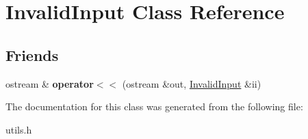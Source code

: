 \hypertarget{class_invalid_input}{}\section{Invalid\+Input Class Reference}
\label{class_invalid_input}
\subsection*{Friends}
\begin{DoxyCompactItemize}
\item 
\hypertarget{class_invalid_input_a6ecc3c0d128c8411aa7a7d336191c9e3}{}\label{class_invalid_input_a6ecc3c0d128c8411aa7a7d336191c9e3} 
ostream \& {\bfseries operator$<$$<$} (ostream \&out, \hyperlink{class_invalid_input}{Invalid\+Input} \&ii)
\end{DoxyCompactItemize}


The documentation for this class was generated from the following file\+:\begin{DoxyCompactItemize}
\item 
utils.\+h\end{DoxyCompactItemize}
